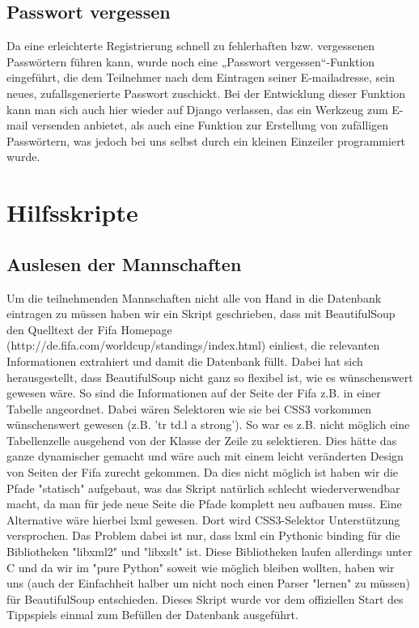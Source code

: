 \documentclass[titlepage, 12pt,a4paper]{scrartcl}
\begin{document}
\subsection{Passwort vergessen}
Da eine erleichterte Registrierung schnell zu fehlerhaften bzw. vergessenen 
Passwörtern führen kann, wurde noch eine „Passwort vergessen“-Funktion 
eingeführt, die dem Teilnehmer nach dem Eintragen seiner E-mailadresse, sein 
neues, zufallsgenerierte Passwort zuschickt. Bei der Entwicklung dieser
Funktion  kann man sich auch hier wieder auf Django verlassen, das ein Werkzeug
zum E-mail versenden anbietet, als auch eine Funktion zur Erstellung von 
zufälligen Passwörtern, was jedoch bei uns selbst durch ein kleinen Einzeiler 
programmiert wurde.

\section{Hilfsskripte}\label{hilfsskripte}
\subsection{Auslesen der Mannschaften}
Um die teilnehmenden Mannschaften nicht alle von Hand in die Datenbank
eintragen  zu müssen haben wir ein Skript geschrieben, dass mit BeautifulSoup 
den Quelltext der Fifa Homepage 
(http://de.fifa.com/worldcup/standings/index.html) einliest, die relevanten 
Informationen extrahiert und damit die Datenbank füllt. Dabei hat sich 
herausgestellt, dass BeautifulSoup nicht ganz so flexibel ist, wie es 
wünschenswert gewesen wäre. So sind die Informationen auf der Seite der Fifa 
z.B. in einer Tabelle angeordnet. Dabei wären Selektoren wie sie bei CSS3 
vorkommen wünschenswert gewesen (z.B. 'tr td.l a strong'). So war es z.B. nicht
möglich eine Tabellenzelle ausgehend von der Klasse der Zeile zu selektieren. 
Dies hätte das ganze dynamischer gemacht und wäre auch mit einem leicht 
veränderten Design von Seiten der Fifa zurecht gekommen. Da dies nicht möglich 
ist haben wir die Pfade "statisch" aufgebaut, was das Skript natürlich schlecht
wiederverwendbar macht, da man für jede neue Seite die Pfade komplett neu 
aufbauen muss. Eine Alternative wäre hierbei lxml gewesen. Dort wird 
CSS3-Selektor Unterstützung versprochen. Das Problem dabei ist nur, dass lxml 
ein Pythonic binding für die Bibliotheken "libxml2" und "libxslt" ist. Diese 
Bibliotheken laufen allerdings unter C und da wir im "pure Python" soweit wie 
möglich bleiben wollten, haben wir uns (auch der Einfachheit halber um nicht 
noch einen Parser "lernen" zu müssen) für BeautifulSoup entschieden. Dieses 
Skript wurde vor dem offiziellen Start des Tippspiels einmal zum Befüllen der 
Datenbank ausgeführt.
\end{document}

